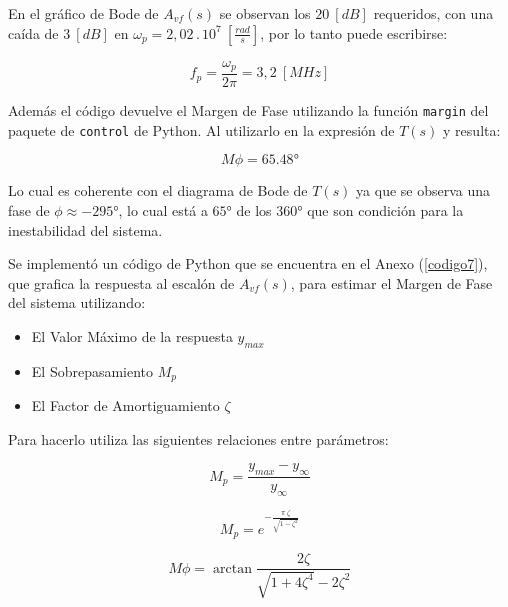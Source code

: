 \documentclass[12pt,a4paper]{article}
\begin{document}
En el gráfico de Bode de $A_{vf}(s)$ se observan los $20~[dB]$ requeridos, con una caída de $3~[dB]$ en $\omega_p = 2,02\,.\,10^7~[\frac{rad}{s}]$, por lo tanto puede escribirse:

\begin{equation}
\label{eq_78}
f_p = \frac{\omega_p}{2\pi} = 3,2~[MHz]
\end{equation}
\hspace{0.5 cm}

Además el código devuelve el Margen de Fase utilizando la función \texttt{margin} del paquete de \texttt{control} de Python. Al utilizarlo en la expresión de $T(s)$ y resulta:

\begin{equation}
\label{eq_79}
M\phi = \ang{65,48}
\end{equation}
\hspace{0.5 cm}

Lo cual es coherente con el diagrama de Bode de $T(s)$ ya que se observa una fase de $\phi \approx \ang{-295}$, lo cual está a $\ang{65}$ de los $\ang{360}$ que son condición para la inestabilidad del sistema.

Se implementó un código de Python que se encuentra en el Anexo (\ref{codigo7}), que grafica la respuesta al escalón de $A_{vf}(s)$, para estimar el Margen de Fase del sistema utilizando:

\begin{itemize}
    \item El Valor Máximo de la respuesta $y_{max}$
    \item El Sobrepasamiento $M_p$        
    \item El Factor de Amortiguamiento $\zeta$
\end{itemize}

Para hacerlo utiliza las siguientes relaciones entre parámetros:


\begin{equation}
\label{eq_80}
M_p = \frac{y_{max} - y_{\infty}}{y_{\infty}}
\end{equation}

\begin{equation}
\label{eq_81}
M_p = e^{-\frac{\pi~\zeta}{\sqrt{1-\zeta^2}}}
\end{equation}

\begin{equation}
\label{eq_82}
M\phi = \arctan{\frac{2\zeta}{\sqrt{1 + 4\zeta^4}-2\zeta^2}}
\end{equation}
\hspace{0.5 cm}
\end{document}
